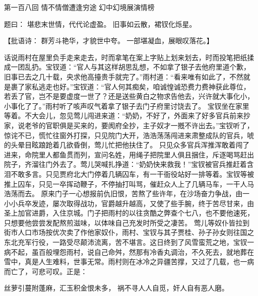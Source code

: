 \documentclass[12pt,oneside]{book}
\begin{document}
 
第一百八回 情不情僧遭逢穷途 幻中幻境展演情榜

题曰：
堪悲末世情，代代论虚盈。
旧事如云散，裙钗化烁星。

【批语诗：
群芳斗艳华，才貌世中夸。
一部堪凝血，展眼叹落花。】

话说雨村在屋里负手走来走去，时而拿笔在案上字贴上划来划去，时而投笔把纸揉成一团乱扔。宝钗道：“官人与其这样胡思乱想，不如拿了银子去他府里道个歉，旧事已去之几十载，央求他高擡贵手就完了。”雨村道：“看来唯有如此了，不然就是裹了家私逃走也好。”宝钗道：“官人何其痴矣，咱诚惶诚恐费力费神获此尊位，若丢了官，岂不是要虚度一世了？还是送些黄白之物求告他去，兴许就大事化小，小事化了了。”雨村听了咳声叹气着拿了银子去门子府里讨饶去了。
宝钗坐在家里等着。不大会儿，忽见莺儿闯进来道：“奶奶，不好了，外面来了好多官兵前来抄家，说老爷的官职俱是买来的，要阂府全抄，主子奴才一摡不许出去。”宝钗听了，惊诧不已，慌忙往窗外打探，只见院门大开，浩浩荡荡闯进来肃整成队的官兵，唬的头晕目眩踉跄着几欲昏倒，莺儿忙把他扶住了。
只见众多官兵浑推浑敢着闯了进来，命院里人都鱼贯而列，宣问名姓，用绳子把院里人俱且捆住，斥逐喝骂赶出院子，齐溜往门外去了。莺儿哭喊扎挣道：“奶奶快来救我！”宝钗被官兵推赶着含泪不敢多言。只见贾府北大门停着几辆囚车，有一干衙役站好一排等着。宝钗等被推上囚车，只见一卒挥动鞭子，不停抽打叫骂，催赶众人上了几辆马车，一干人马浩荡而去。
原来门子一心想报前仇旧恨，苦熬了些许年，在沙场奋力争战，由一小小兵卒发迹，屡次取得战功，官爵越升越高，又使了些手腕，终于苦尽甘来，由圣上加官进爵，入住京城。门子把雨村的以往贪酷之弊查个七八，也不要他速死，只想要他尝尝发配熬煎滋味，以体味自己充发时所受之凄苦。
莺儿等奴仆皆拉到街市人口市场按优次卖了作他家奴仆，雨村、宝钗与其子贾桂、孙子孙女则往国之东北充军行役，一路受尽颠沛流离，苦不堪言。这日终到了风雪蛮荒之地，宝钗一病不起，虽百般埋怨雨村，说自己命舛，然那有冷香丸调治，不久死去，就地葬在雪中，真是人生难料，世事无常。雨村则在冰冷之异疆苦撑，又过了几载，也一病而亡了，可悲可叹。正是：

丝萝引蔓附蓬麻，汇玉积金恨未多，
祸不寻人人自觅，奸人自有恶人磨。
\end{document}
